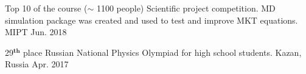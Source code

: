 \begin{cvhonors}
    \vspace{5pt}
    
  \cvhonor
    {Top 10 of the course ($\sim$ 1100 people)} %
    {Scientific project competition. MD simulation package was created and used to test and improve MKT equations.} %
    {MIPT} %
    {Jun. 2018 \vspace{15pt}} %
    

  \cvhonor
    {29$^{\textbf{th}}$ place} %
    {Russian National Physics Olympiad for high school students.} %
    {Kazan, Russia} %
    {\vspace{5pt} Apr. 2017} %
    
	\vspace{5pt}
	
\end{cvhonors}
